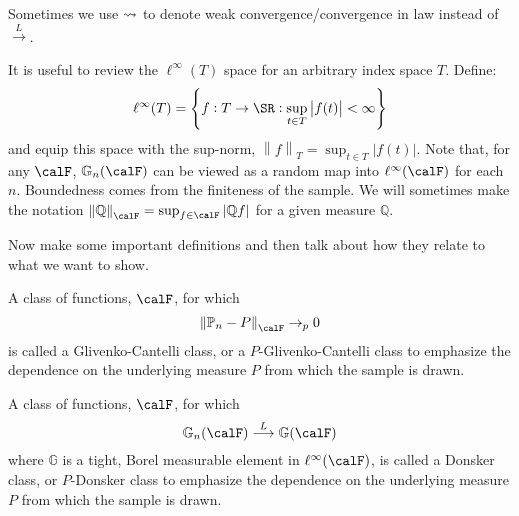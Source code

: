 \begin{remark*}[Notation]
	Sometimes we use \(\rightsquigarrow\) to denote weak convergence/convergence in law instead of  \(\overset{L}{\to}\).	
\end{remark*}

\begin{remark*}
    \label{rem:def-recall}
	It is useful to review the \(\ell^\infty(T)\) space for an arbitrary index space  \(T\). Define:
	\begin{equation}
		\label{eq:ell-infty}
		\ell^\infty(T) = \left\{f:T\to\SR: \sup_{t\in T}\left|f(t)\right| <\infty\right\}
	\end{equation}
	and equip this space with the sup-norm, \(\left\|f\right\|_T = \sup_{t\in T}\left|f(t)\right|\). Note that, for any \(\calF\),  \(\mathbb{G}_n(\calF)\) can be viewed as a random map into \(\ell^\infty(\calF)\) for each \(n\). Boundedness comes from the finiteness of the sample. We will sometimes make the notation \(\left\|\mathbb{Q}\right\|_\calF = \sup_{f\in\calF}\left|\mathbb{Q}f\right|\) for a given measure \(\mathbb{Q}\).
\end{remark*}

Now make some important definitions and then talk about how they relate to what we want to show. 

\begin{definition}
	\label{def:gc-class}
	A class of functions, \(\calF\), for which
	\begin{equation}
		\label{eq:gc-def}
		\left\|\P_n-P\right\|_\calF \to_p 0
	\end{equation}
	is called a Glivenko-Cantelli class, or a \(P\)-Glivenko-Cantelli class to emphasize the dependence on the underlying measure \(P\) from which the sample is drawn.
\end{definition}

\begin{definition}
	\label{def:donsker-class}
	A class of functions, \(\calF\), for which
	 \begin{equation}
		\label{eq:donsker-def}
		\mathbb{G}_n(\calF) \overset{L}{\longrightarrow} \mathbb{G}(\calF)
	\end{equation}
	where \(\mathbb{G}\) is a tight, Borel measurable element in \(\ell^\infty(\calF)\), is called a Donsker class, or  \(P\)-Donsker class to emphasize the dependence on the underlying measure  \(P\) from which the sample is drawn.
\end{definition}

